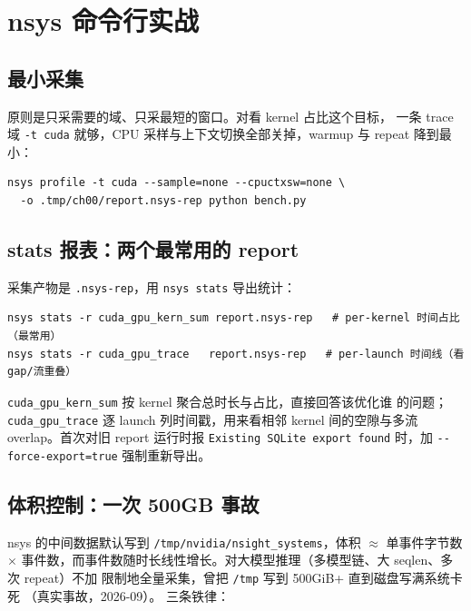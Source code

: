 \section{nsys 命令行实战}\label{sec:ch00-nsys}

\subsection{最小采集}

原则是只采需要的域、只采最短的窗口。对看 kernel 占比这个目标，
一条 trace 域 \texttt{-t cuda} 就够，CPU 采样与上下文切换全部关掉，warmup
与 repeat 降到最小：

\begin{lstlisting}[style=console, title={nsys 最小采集（kernel 时间占比场景）}]
nsys profile -t cuda --sample=none --cpuctxsw=none \
  -o .tmp/ch00/report.nsys-rep python bench.py
\end{lstlisting}

\subsection{stats 报表：两个最常用的 report}

采集产物是 \texttt{.nsys-rep}，用 \texttt{nsys stats} 导出统计：

\begin{lstlisting}[style=console, title={nsys stats 两个高频 report}]
nsys stats -r cuda_gpu_kern_sum report.nsys-rep   # per-kernel 时间占比（最常用）
nsys stats -r cuda_gpu_trace   report.nsys-rep   # per-launch 时间线（看 gap/流重叠）
\end{lstlisting}

\texttt{cuda\_\allowbreak{}gpu\_\allowbreak{}kern\_\allowbreak{}sum} 按 kernel 聚合总时长与占比，直接回答该优化谁
的问题；\texttt{cuda\_\allowbreak{}gpu\_\allowbreak{}trace} 逐 launch 列时间戳，用来看相邻 kernel
间的空隙与多流 overlap。首次对旧 report 运行时报
\texttt{Existing SQLite export found} 时，加 \texttt{-{}-force-export=\allowbreak{}true}
强制重新导出。

\subsection{体积控制：一次 500GB 事故}

nsys 的中间数据默认写到 \texttt{/\allowbreak{}tmp/\allowbreak{}nvidia/\allowbreak{}nsight\_\allowbreak{}systems}，体积 $\approx$
单事件字节数 $\times$ 事件数，而事件数随时长线性增长。对大模型推理（多模型链、大 seqlen、多次 repeat）不加
限制地全量采集，曾把 \texttt{/tmp} 写到 500GiB+ 直到磁盘写满系统卡死
（真实事故，2026-09）。
三条铁律：

